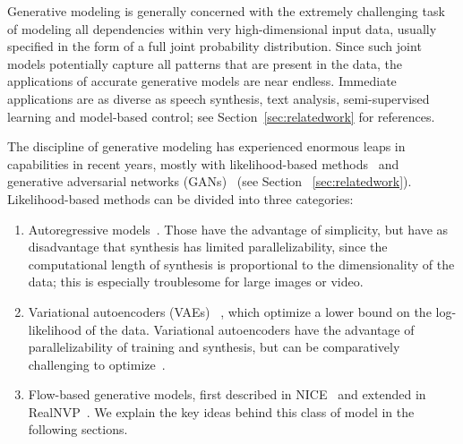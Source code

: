 \documentclass{article}
\begin{document}
Generative modeling is generally concerned with the extremely challenging task of modeling all dependencies within very high-dimensional input data, usually specified in the form of a full joint probability distribution. Since such joint models potentially capture all patterns that are present in the data, the applications of accurate generative models are near endless. Immediate applications are as diverse as speech synthesis, text analysis, semi-supervised learning and model-based control; see Section~\ref{sec:relatedwork} for references.

The discipline of generative modeling has experienced enormous leaps in capabilities in recent years, mostly with likelihood-based methods~\citep{graves2013generating,kingma2013auto,kingma2018vaes,dinh2014nice,pixelrnn} and generative adversarial networks (GANs)~\citep{goodfellow2014generative} (see Section ~\ref{sec:relatedwork}). Likelihood-based methods can be divided into three categories:
\begin{enumerate}
\item Autoregressive models~\citep{hochreiter1997long,graves2013generating,pixelrnn,oord2016conditional,van2016wavenet}. Those have the advantage of simplicity, but have as disadvantage that synthesis has limited parallelizability, since the computational length of synthesis is proportional to the dimensionality of the data; this is especially troublesome for large images or video.
\item Variational autoencoders (VAEs) ~\citep{kingma2013auto,kingma2018vaes}, which optimize a lower bound on the log-likelihood of the data. Variational autoencoders have the advantage of parallelizability of training and synthesis, but can be comparatively challenging to optimize~\citep{kingma2016improving}.
\item Flow-based generative models, first described in NICE~\citep{dinh2014nice} and extended in RealNVP~\citep{dinh2016density}. We explain the key ideas behind this class of model in the following sections.
\end{enumerate}
\end{document}
